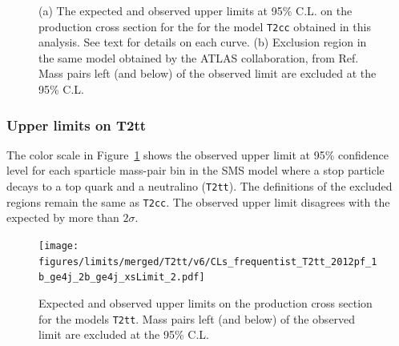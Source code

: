 \begin{figure}[h!]
  \begin{center}
    \caption{(a) The expected and observed upper limits at 95\% C.L. on the production cross section 
    for the for the model \texttt{T2cc} obtained in this analysis. See text for details on each curve.
    (b) Exclusion region in the same model obtained by the ATLAS collaboration, from Ref.~\cite{Aad:2014nra}
    Mass pairs left (and below) of the observed limit are excluded at the 95\% C.L.}
  \end{center}
\end{figure}

\subsubsection{Upper limits on T2tt}

The color scale in Figure~\ref{fig:upperLimits-t2tt} shows the observed upper 
limit at 95\% confidence level for each sparticle mass-pair bin in the SMS 
model where a stop particle decays to a top quark and a neutralino (\texttt{T2tt}). 
The definitions of the excluded regions remain the same as \texttt{T2cc}.
The observed upper limit disagrees with the expected by more than $2\sigma$.

\begin{figure}[h!]
  \begin{center}
      \texttt{[image: figures/limits/merged/T2tt/v6/CLs\_frequentist\_T2tt\_2012pf\_1b\_ge4j\_2b\_ge4j\_xsLimit\_2.pdf]}
    \caption{\label{fig:upperLimits-t2tt}Expected and observed upper limits on the production cross section 
    for the models \texttt{T2tt}. Mass pairs left (and below) of the observed limit are excluded at the 95\% C.L.}
  \end{center}
\end{figure}

